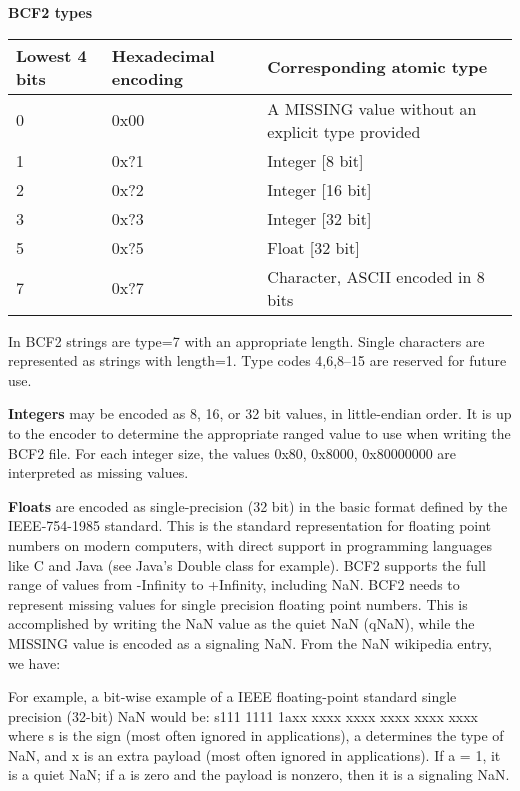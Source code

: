 \documentclass[8pt]{article}
\begin{document}
\textbf{BCF2 types}

\vspace{0.3cm}
\begin{tabular}{|l | l | l|} \hline
Lowest 4 bits & Hexadecimal encoding & Corresponding atomic type \\ \hline
0 & 0x00 & A MISSING value without an explicit type provided \\ \hline
1 & 0x?1 & Integer [8 bit] \\ \hline
2 & 0x?2 & Integer [16 bit] \\ \hline
3 & 0x?3 & Integer [32 bit] \\ \hline
5 & 0x?5 & Float [32 bit] \\ \hline
7 & 0x?7 & Character, ASCII encoded in 8 bits \\ \hline
\end{tabular}
\vspace{0.3cm}

In BCF2 strings are type=7 with an appropriate length.
Single characters are represented as strings with length=1.
Type codes 4,6,8--15 are reserved for future use.

\vspace{0.3cm}

\textbf{Integers} may be encoded as 8, 16, or 32 bit values, in little-endian order.  It is up to the encoder to determine the appropriate ranged value to use when writing the BCF2 file.  For each integer size, the values 0x80, 0x8000, 0x80000000 are interpreted as missing values.

\vspace{0.3cm}
\textbf{Floats} are encoded as single-precision (32 bit) in the basic format defined by the IEEE-754-1985 standard.  This is the standard representation for floating point numbers on modern computers, with direct support in programming languages like C and Java (see Java's Double class for example).  BCF2 supports the full range of values from -Infinity to +Infinity, including NaN.  BCF2 needs to represent missing values for single precision floating point numbers.  This is accomplished by writing the NaN value as the quiet NaN (qNaN), while the MISSING value is encoded as a signaling NaN.  From the NaN wikipedia entry, we have:

For example, a bit-wise example of a IEEE floating-point standard single precision (32-bit) NaN would be:
s111 1111 1axx xxxx xxxx xxxx xxxx xxxx where s is the sign (most often ignored in applications), a determines the type of NaN, and x
is an extra payload (most often ignored in applications).  If a = 1, it is a quiet NaN; if a is zero and the payload is nonzero, then it is a
signaling NaN.
\end{document}
